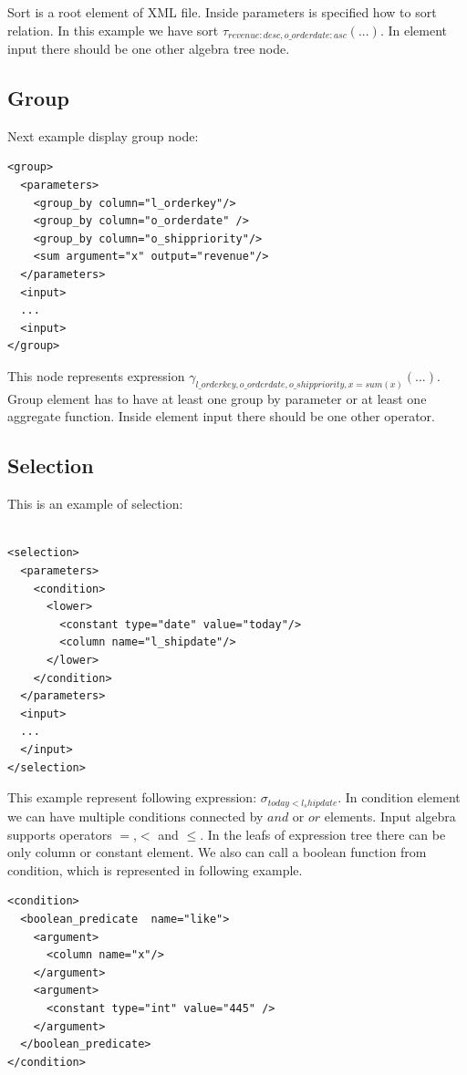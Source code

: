 Sort is a root element of XML file. Inside parameters is specified how to sort relation. In this example we have sort $\tau_{revenue:desc,o\_orderdate:asc}(...)$. In element input there should be one other algebra tree node.

\subsection{Group}

Next example display group node:

\begin{lstlisting}
<group>
  <parameters>
    <group_by column="l_orderkey"/>
    <group_by column="o_orderdate" />
    <group_by column="o_shippriority"/>
    <sum argument="x" output="revenue"/>
  </parameters>
  <input>
  ...
  <input>
</group>
\end{lstlisting}

This node represents expression $\gamma_{l\_orderkey,o\_orderdate,o\_shippriority,x=sum(x)}(...)$. Group element has to have at least one group by parameter or at least one aggregate function. Inside element input there should be one other operator.

\subsection{Selection}

This is an example of selection:

\begin{lstlisting}

<selection>
  <parameters>
    <condition>
      <lower>
        <constant type="date" value="today"/>
        <column name="l_shipdate"/>
      </lower>
    </condition>
  </parameters>
  <input>
  ...
  </input>
</selection>
\end{lstlisting}
This example represent following expression: $\sigma_{today<l_shipdate}$. In condition element we can have multiple conditions connected by $and$ or $or$ elements. Input algebra supports operators $=$,$<$ and $\leq$. In the leafs of expression tree there can be only column or constant element. We also can call a boolean function from condition, which is represented in following example.

\begin{lstlisting}
<condition>
  <boolean_predicate  name="like">
    <argument>
      <column name="x"/>
    </argument>
    <argument>
      <constant type="int" value="445" />
    </argument>
  </boolean_predicate>
</condition>
\end{lstlisting}

